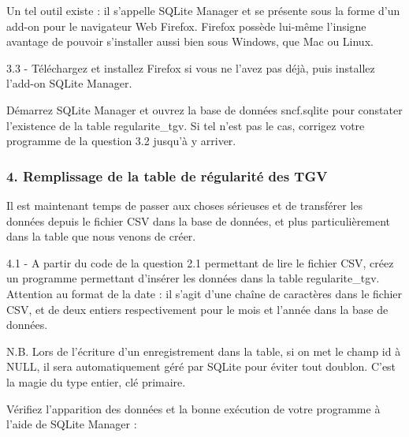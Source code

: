 \documentclass{article}
\begin{document}
Un tel outil existe : il s'appelle SQLite Manager et se présente sous la
forme d'un add-on pour le navigateur Web Firefox. Firefox possède
lui-même l'insigne avantage de pouvoir s'installer aussi bien sous
Windows, que Mac ou Linux.

    3.3 - Téléchargez et installez Firefox si vous ne l'avez pas déjà, puis
installez l'add-on SQLite Manager.

Démarrez SQLite Manager et ouvrez la base de données sncf.sqlite pour
constater l'existence de la table regularite\_tgv. Si tel n'est pas le
cas, corrigez votre programme de la question 3.2 jusqu'à y arriver. 

    \subsubsection{4. Remplissage de la table de régularité des
TGV}\label{remplissage-de-la-table-de-ruxe9gularituxe9-des-tgv}

    Il est maintenant temps de passer aux choses sérieuses et de transférer
les données depuis le fichier CSV dans la base de données, et plus
particulièrement dans la table que nous venons de créer.

    4.1 - A partir du code de la question 2.1 permettant de lire le fichier
CSV, créez un programme permettant d'insérer les données dans la table
regularite\_tgv. Attention au format de la date : il s'agit d'une chaîne
de caractères dans le fichier CSV, et de deux entiers respectivement
pour le mois et l'année dans la base de données.

N.B. Lors de l'écriture d'un enregistrement dans la table, si on met le
champ id à NULL, il sera automatiquement géré par SQLite pour éviter
tout doublon. C'est la magie du type entier, clé primaire.

Vérifiez l'apparition des données et la bonne exécution de votre
programme à l'aide de SQLite Manager : 
\end{document}
